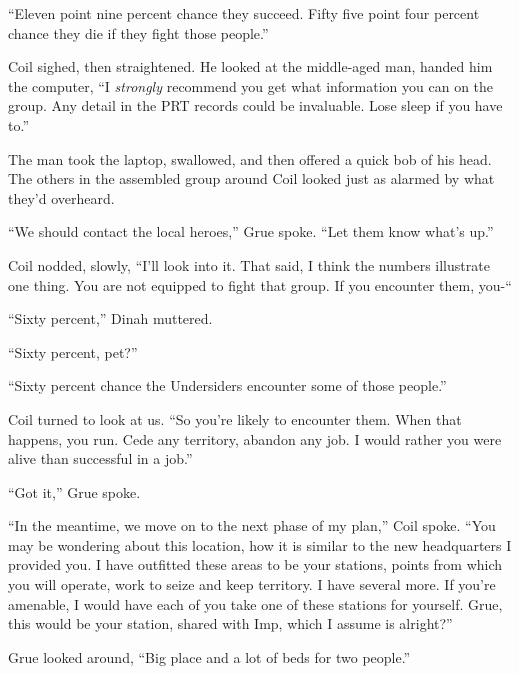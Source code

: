 ``Eleven point nine percent chance they succeed.  Fifty five point four percent chance they die if they fight those people.''



Coil sighed, then straightened.  He looked at the middle-aged man, handed him the computer, ``I \emph{strongly} recommend you get what information you can on the group.  Any detail in the PRT records could be invaluable.  Lose sleep if you have to.''



The man took the laptop, swallowed, and then offered a quick bob of his head.  The others in the assembled group around Coil looked just as alarmed by what they'd overheard.



``We should contact the local heroes,'' Grue spoke.  ``Let them know what's up.''



Coil nodded, slowly, ``I'll look into it.  That said, I think the numbers illustrate one thing.  You are not equipped to fight that group.  If you encounter them, you-``



``Sixty percent,'' Dinah muttered.



``Sixty percent, pet?''



``Sixty percent chance the Undersiders encounter some of those people.''



Coil turned to look at us.  ``So you're likely to encounter them.  When that happens, you run.  Cede any territory, abandon any job.  I would rather you were alive than successful in a job.''



``Got it,'' Grue spoke.



``In the meantime, we move on to the next phase of my plan,'' Coil spoke.  ``You may be wondering about this location, how it is similar to the new headquarters I provided you.  I have outfitted these areas to be your stations, points from which you will operate, work to seize and keep territory.  I have several more.  If you're amenable, I would have each of you take one of these stations for yourself.  Grue, this would be your station, shared with Imp, which I assume is alright?''



Grue looked around, ``Big place and a lot of beds for two people.''



